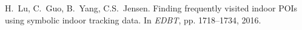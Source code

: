 \begin{frame}[allowframebreaks]
\begin{thebibliography}{99}
{
H.~Lu, C.~Guo, B.~Yang, C.S.~Jensen.
\newblock Finding frequently visited indoor POIs using symbolic indoor tracking data.
\newblock In {\em EDBT}, pp. 1718--1734, 2016.

}
\end{thebibliography}

\end{frame}
